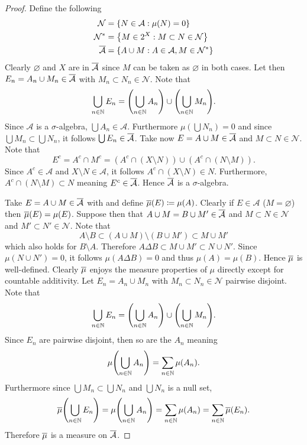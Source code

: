 \documentclass[hw_all.tex]{subfiles}
\begin{document}
\begin{proof}
    \newcommand\aRefine{\conj{\mathcal{A}}}
    \newcommand\aNull{\mathcal{N}}
    \newcommand\aNullS{\mathcal{N}^*}
    Define the following 
    \begin{align*}
    \aNull &= \qty{N \in \mathcal{A} : \mu(N) = 0} \\
    \aNullS &= \qty{M \in 2^X : M \subset N \in \aNull} \\
    \aRefine &= \qty{A \cup M : A \in \mathcal{A}, M \in \aNullS}
    \end{align*}
    Clearly $\varnothing$ and $X$ are in $\aRefine$ since $M$ can be taken as $\varnothing$ in both cases. Let then $E_n = A_n \cup M_n \in \aRefine$ with $M_n \subset N_n \in \aNull$. Note that
    \[
        \bigcup_{n \in \mathbb{N}} E_n = \qty(\bigcup_{n \in \mathbb{N}} A_n) \cup \qty(\bigcup_{n \in \mathbb{N}} M_n)
    .\]
    Since $\mathcal{A}$ is a $\sigma$-algebra, $\bigcup A_n \in \mathcal{A}$. Furthermore $\mu(\bigcup N_n) = 0$ and since $\bigcup M_n \subset \bigcup N_n$, it follows $\bigcup E_n \in \aRefine$. Take now $E = A \cup M \in \aRefine$ and $M \subset N \in \aNull$. Note that
    \[
        E^c = A^c \cap M^c = (A^c \cap (X \setminus N)) \cup (A^c \cap (N \setminus M))
    .\]
    Since $A^c \in \mathcal{A}$ and $X \setminus N \in \mathcal{A}$, it follows $A^c \cap (X \setminus N) \in N$. Furthermore, $A^c \cap (N \setminus M) \subset N$ meaning $E^c \in \aRefine$. Hence $\aRefine$ is a $\sigma$-algebra.

    Take $E = A \cup M \in \aRefine$ with and define $\overline{\mu}(E) \coloneq \mu(A)$. Clearly if $E \in \mathcal{A}$ ($M = \varnothing$) then $\overline{\mu}(E) = \mu(E)$. Suppose then that $A \cup M = B \cup M' \in \aRefine$ and $M \subset N \in \aNull$ and $M' \subset N' \in \aNull$. Note that
    \[
        A \setminus B \subset (A \cup M) \setminus (B \cup M') \subset M \cup M'
    \]
    which also holds for $B \setminus A$. Therefore $A \Delta B \subset M \cup M' \subset N \cup N'$. Since $\mu(N \cup N') = 0$, it follows $\mu(A \Delta B) = 0$ and thus $\mu(A) = \mu(B)$. Hence $\overline{\mu}$ is well-defined. Clearly $\overline{\mu}$ enjoys the measure properties of $\mu$ directly except for countable additivity. Let $E_n = A_n \cup M_n$ with $M_n \subset N_n \in \aNull$ pairwise disjoint. Note that
    \[
        \bigcup_{n \in \mathbb{N}} E_n = \qty(\bigcup_{n \in \mathbb{N}} A_n) \cup \qty(\bigcup_{n \in \mathbb{N}} M_n)
    .\]
    Since $E_n$ are pairwise disjoint, then so are the $A_n$ meaning
    \[
        \mu\qty(\bigcup_{n \in \mathbb{N}} A_n) = \sum_{n \in \mathbb{N}} \mu(A_n)
    .\]
    Furthermore since $\bigcup M_n \subset \bigcup N_n$ and $\bigcup N_n$ is a null set,
    \[
        \overline{\mu}\qty(\bigcup_{n \in \mathbb{N}} E_n) = \mu\qty(\bigcup_{n \in \mathbb{N}} A_n) = \sum_{n \in \mathbb{N}} \mu(A_n) = \sum_{n \in \mathbb{N}} \overline{\mu}(E_n)
    .\]
    Therefore $\overline{\mu}$ is a measure on $\aRefine$.


\end{proof}
\end{document}
